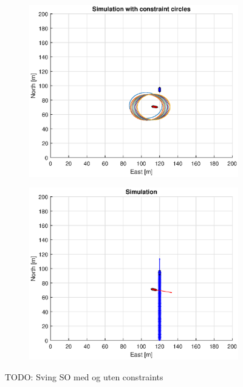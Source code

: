 \begin{figure}[ht]\ContinuedFloat
    \begin{subfigure}[b]{0.49\textwidth}
        \centering
        \includegraphics[width=\textwidth]{Images/Figures/sving_SO/Simple0_f1_Frame4}
    \end{subfigure}
    \hfill
    \begin{subfigure}[b]{0.499\textwidth}
        \centering
        \includegraphics[width=\textwidth]{Images/Figures/sving_SO/Simple0_f600_Frame4}
    \end{subfigure}
    \caption{TODO: Sving SO med og uten constraints}
\end{figure}

